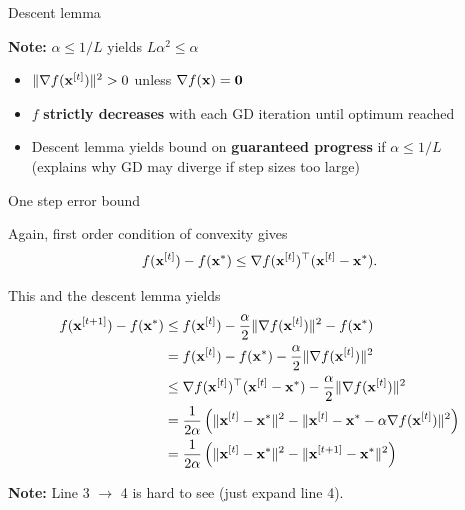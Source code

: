 \documentclass[11pt,compress,t,notes=noshow, xcolor=table]{beamer}
\begin{document}
\begin{vbframe}{Descent lemma}
\begin{small}
\textbf{Note:} $\alpha \leq 1/L$ yields $L \alpha^2 \leq \alpha$


\begin{itemize}
    \item $\|\nabla f(\mathbf{x}^{[t]})\|^2 > 0$ unless $\nabla f(\mathbf{x}) = \mathbf{0}$
    \item $f$ \textbf{strictly decreases} with each GD iteration until optimum reached
    \item Descent lemma yields bound on \textbf{guaranteed progress} if $\alpha \leq 1/L$ \\
        (explains why GD may diverge if step sizes too large)
\end{itemize}
\end{small}

\end{vbframe}


\begin{vbframe}{One step error bound}

Again, first order condition of convexity gives 
$$
    f(\mathbf{x}^{[t]}) - f(\mathbf{x}^\ast) \leq  \nabla f(\mathbf{x}^{[t]})^\top (\mathbf{x}^{[t]} - \mathbf{x}^\ast).
$$

This and the descent lemma yields
\begin{align*}
    f(\mathbf{x}^{[t+1]}) - f(\mathbf{x}^\ast) &\leq f(\mathbf{x}^{[t]})  - \frac{\alpha}{2}\|\nabla f(\mathbf{x}^{[t]})\|^2  - f(\mathbf{x}^\ast) \\
    &= f(\mathbf{x}^{[t]})  - f(\mathbf{x}^\ast)  - \frac{\alpha}{2}\|\nabla f(\mathbf{x}^{[t]})\|^2 \\
    &\leq \nabla f(\mathbf{x}^{[t]})^\top (\mathbf{x}^{[t]}-\mathbf{x}^*) - \frac{\alpha}{2}\|\nabla f(\mathbf{x}^{[t]})\|^2 \\
    &= \frac{1}{2 \alpha} \left( \|\mathbf{x}^{[t]}-\mathbf{x}^\ast\|^2 - \| \mathbf{x}^{[t]} - \mathbf{x}^\ast - \alpha \nabla f(\mathbf{x}^{[t]})\|^2 \right) \\
    &= \frac{1}{2 \alpha} \left( \|\mathbf{x}^{[t]}-\mathbf{x}^\ast\|^2 - \| \mathbf{x}^{[t+1]} - \mathbf{x}^\ast \|^2 \right)
\end{align*}

\textbf{Note:} Line 3 $\to$ 4 is hard to see (just expand line 4).

\end{vbframe}
\end{document}
